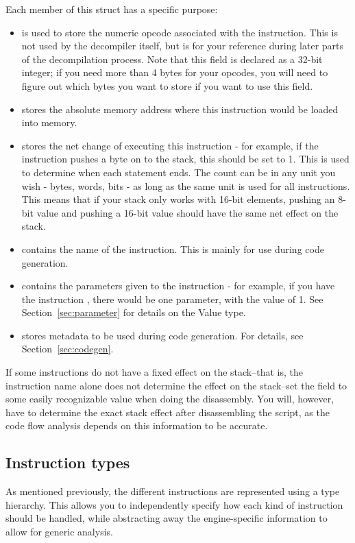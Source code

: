 Each member of this struct has a specific purpose:
\begin{itemize}
\item {} is used to store the numeric opcode associated with the instruction. This is not used by the decompiler itself, but is for your reference during later parts of the decompilation process. Note that this field is declared as a 32-bit integer; if you need more than 4 bytes for your opcodes, you will need to figure out which bytes you want to store if you want to use this field.
\item {} stores the absolute memory address where this instruction would be loaded into memory.
\item {} stores the net change of executing this instruction - for example, if the instruction pushes a byte on to the stack, this should be set to 1. This is used to determine when each statement ends. The count can be in any unit you wish - bytes, words, bits - as long as the same unit is used for all instructions. This means that if your stack only works with 16-bit elements, pushing an 8-bit value and pushing a 16-bit value should have the same net effect on the stack.
\item {} contains the name of the instruction. This is mainly for use during code generation.
\item {} contains the parameters given to the instruction - for example, if you have the instruction , there would be one parameter, with the value of 1. See Section~\vref{sec:parameter} for details on the Value type.
\item {} stores metadata to be used during code generation. For details, see Section~\vref{sec:codegen}.
\end{itemize}

If some instructions do not have a fixed effect on the stack--that is, the instruction name alone does not determine the effect on the stack--set the field to some easily recognizable value when doing the disassembly. You will, however, have to determine the exact stack effect after disassembling the script, as the code flow analysis depends on this information to be accurate.

\subsection{Instruction types}
\label{sec:insttype}
As mentioned previously, the different instructions are represented using a type hierarchy. This allows you to independently specify how each kind of instruction should be handled, while abstracting away the engine-specific information to allow for generic analysis.

